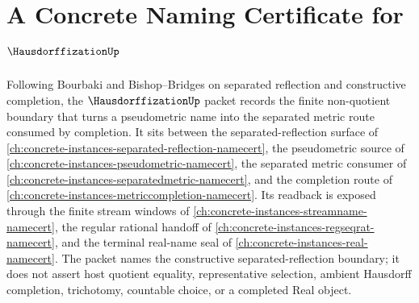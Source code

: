 \chapter{A Concrete Naming Certificate for $\HausdorffizationUp$}
\label{ch:concrete-instances-hausdorffization-namecert}

Following Bourbaki and Bishop--Bridges on separated reflection and constructive completion, the $\HausdorffizationUp$ packet records the finite non-quotient boundary that turns a pseudometric name into the separated metric route consumed by completion. It sits between the separated-reflection surface of \autoref{ch:concrete-instances-separated-reflection-namecert}, the pseudometric source of \autoref{ch:concrete-instances-pseudometric-namecert}, the separated metric consumer of \autoref{ch:concrete-instances-separatedmetric-namecert}, and the completion route of \autoref{ch:concrete-instances-metriccompletion-namecert}. Its readback is exposed through the finite stream windows of \autoref{ch:concrete-instances-streamname-namecert}, the regular rational handoff of \autoref{ch:concrete-instances-regseqrat-namecert}, and the terminal real-name seal of \autoref{ch:concrete-instances-real-namecert}. The packet names the constructive separated-reflection boundary; it does not assert host quotient equality, representative selection, ambient Hausdorff completion, trichotomy, countable choice, or a completed Real object.

